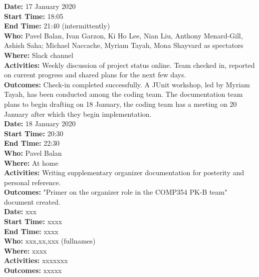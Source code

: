\documentclass[12pt]{article}
\begin{document}
{\bf Date:} 17 January 2020\\
{\bf Start Time:} 18:05\\
{\bf End Time:} 21:40 (intermittently) \\
{\bf Who:} Pavel Balan, Ivan Garzon, Ki Ho Lee, Nian Liu, Anthony Menard-Gill, Ashish Saha; Michael Naccache, Myriam Tayah, Mona Shayvard as spectators\\
{\bf Where:} Slack channel \\
{\bf Activities:} Weekly discussion of project status online. Team checked in, reported on current progress and shared plans for the next few days.\\
{\bf Outcomes:} Check-in completed successfully. A JUnit workshop, led by Myriam Tayah, has been conducted among the coding team. The documentation team plans to begin drafting on 18 January, the coding team has a meeting on 20 January after which they begin implementation.\\

{\bf Date:} 18 January 2020\\
{\bf Start Time:} 20:30\\
{\bf End Time:} 22:30 \\
{\bf Who:} Pavel Balan\\
{\bf Where:} At home \\
{\bf Activities:} Writing supplementary organizer documentation for posterity and personal reference.\\
{\bf Outcomes:} "Primer on the organizer role in the COMP354 PK-B team" document created.\\

{\bf Date:} xxx\\
{\bf Start Time:} xxxx\\
{\bf End Time:} xxxx \\
{\bf Who:} xxx,xx,xxx (fullnames)\\
{\bf Where:} xxxx \\
{\bf Activities:} xxxxxxx\\
{\bf Outcomes:} xxxxx\\


\end{document}
